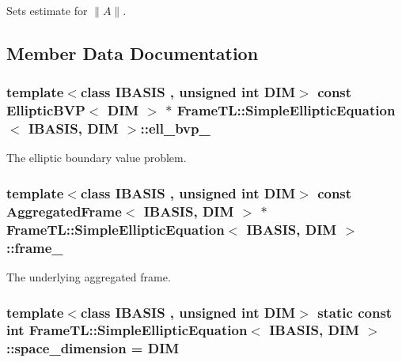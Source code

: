 Sets estimate for $\|A\|$. 

\subsection{Member Data Documentation}
\hypertarget{classFrameTL_1_1SimpleEllipticEquation_8070f6b619aac2cb61020481df7b09a8}{
\subsubsection[{ell\_\-bvp\_\-}]{\setlength{\rightskip}{0pt plus 5cm}template$<$class IBASIS , unsigned int DIM$>$ const EllipticBVP$<$ DIM $>$ $\ast$ {\bf FrameTL::SimpleEllipticEquation}$<$ IBASIS, DIM $>$::{\bf ell\_\-bvp\_\-}}}
\label{classFrameTL_1_1SimpleEllipticEquation_8070f6b619aac2cb61020481df7b09a8}


The elliptic boundary value problem. \hypertarget{classFrameTL_1_1SimpleEllipticEquation_8cd2f036aa5557d584d8be5acf80e958}{
\subsubsection[{frame\_\-}]{\setlength{\rightskip}{0pt plus 5cm}template$<$class IBASIS , unsigned int DIM$>$ const {\bf AggregatedFrame}$<$ IBASIS, DIM $>$ $\ast$ {\bf FrameTL::SimpleEllipticEquation}$<$ IBASIS, DIM $>$::{\bf frame\_\-}}}
\label{classFrameTL_1_1SimpleEllipticEquation_8cd2f036aa5557d584d8be5acf80e958}


The underlying aggregated frame. \hypertarget{classFrameTL_1_1SimpleEllipticEquation_b3b9b916f42e8cf03bda2a6230141e79}{
\subsubsection[{space\_\-dimension}]{\setlength{\rightskip}{0pt plus 5cm}template$<$class IBASIS , unsigned int DIM$>$ static const int {\bf FrameTL::SimpleEllipticEquation}$<$ IBASIS, DIM $>$::{\bf space\_\-dimension} = DIM}}
\label{classFrameTL_1_1SimpleEllipticEquation_b3b9b916f42e8cf03bda2a6230141e79}


